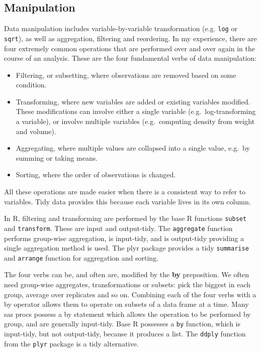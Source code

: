 \documentclass[article]{jss}
\begin{document}
\subsection{Manipulation}

Data manipulation includes variable-by-variable transformation (e.g. {\tt log} or {\tt sqrt}), as well as aggregation, filtering and reordering. In my experience, there are four extremely common operations that are performed over and over again in the course of an analysis. These are the four fundamental verbs of data manipulation:

\begin{itemize}

  \item Filtering, or subsetting, where observations are removed based on some
  condition.

  \item Transforming, where new variables are added or existing variables
  modified. These modifications can involve either a single variable (e.g.\ 
  log-transforming a variable), or involve multiple variables (e.g.\ computing
  density from weight and volume).

  \item Aggregating, where multiple values are collapsed into a single value,
  e.g.\ by summing or taking means.

  \item Sorting, where the order of observations is changed.

\end{itemize}

All these operations are made easier when there is a consistent way to refer to variables. Tidy data provides this because each variable lives in its own column.

In R, filtering and transforming are performed by the base R functions {\tt subset} and {\tt transform}. These are input and output-tidy. The {\tt aggregate} function performs group-wise aggregation, is input-tidy, and is output-tidy providing a single aggregation method is used. The plyr package provides a tidy {\tt summarise} and {\tt arrange} function for aggregation and sorting.

The four verbs can be, and often are, modified by the \textbf{by} preposition. We often need group-wise aggregates, transformations or subsets: pick the biggest in each group, average over replicates and so on. Combining each of the four verbs with a by operator allows them to operate on subsets of a data frame at a time. Many {\sc sas} {\sc proc}s possess a {\sc by} statement which allows the operation to be performed by group, and are generally input-tidy. Base R possesses a {\tt by} function, which is input-tidy, but not output-tidy, because it produces a list. The {\tt ddply} function from the {\tt plyr} package is a tidy alternative.
\end{document}
